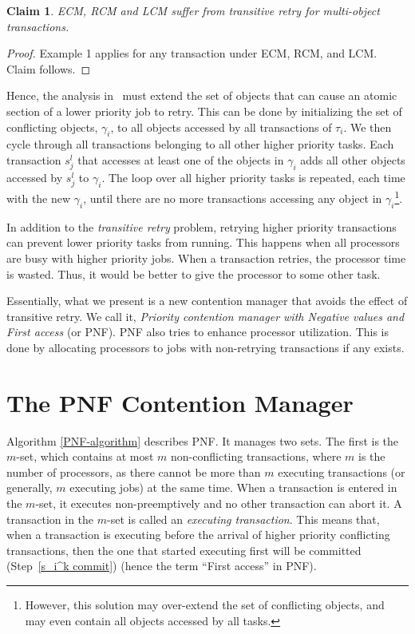 \documentclass[twocolumn]{article}
\newtheorem{clm}{Claim}
\newtheorem{proof}{Proof}
\begin{document}
\begin{clm}\label{ecm-rcm-transitive-retry}
ECM, RCM and LCM suffer from transitive retry for multi-object transactions.
\end{clm}
\begin{proof}\normalfont
Example 1 applies for any transaction under ECM, RCM, and LCM. Claim follows.
\end{proof}
Hence, the analysis in~\cite{stmconcurrencycontrol:emsoft11,lcmdac2012} must extend the set of objects that can cause an atomic section of a lower priority job to retry.  This can be done by initializing the set of conflicting objects, $\gamma_i$, to all objects accessed by all transactions of $\tau_i$. We then cycle through all transactions belonging to all other higher priority tasks. Each transaction $s_j^l$ that accesses at least one of the objects in $\gamma_i$ adds all other objects accessed by $s_j^l$ to $\gamma_i$. The loop over all higher priority tasks is repeated, each time with the new $\gamma_i$, until there are no more transactions accessing any object in $\gamma_i$\footnote{However, this solution may over-extend the set of conflicting objects, and may even contain all objects accessed by all tasks.}.

In addition to the \emph{transitive retry} problem, retrying higher priority transactions can prevent lower priority tasks from running. This happens when all processors are busy with higher priority jobs. When a transaction retries, the processor time is wasted. Thus, it would be better to give the processor to some other task.

Essentially, what we present is a new contention manager that avoids the effect of transitive retry. We call it, \textit{Priority contention manager with Negative values and First access} (or PNF). PNF also tries to enhance processor utilization. This is done by allocating processors to jobs with non-retrying transactions if any exists. 

\section{The PNF Contention Manager\label{PNF}}

Algorithm \ref{PNF-algorithm} describes PNF. It
manages two sets. The first is the $m$-set, which contains at most $m$ non-conflicting
transactions, where $m$ is the number of processors, as
there cannot be more than $m$ executing transactions (or generally,
$m$ executing jobs) at the same time. When a transaction is entered
in the $m$-set, it executes non-preemptively and no other transaction
can abort it. A transaction in the $m$-set is called an \emph{executing
transaction}. 
This means that, when a transaction is executing before
the arrival of higher priority conflicting transactions, then the
one that started executing first will be committed (Step~\ref{s_i^k commit}) (hence the term ``First access'' in PNF).
\end{document}

